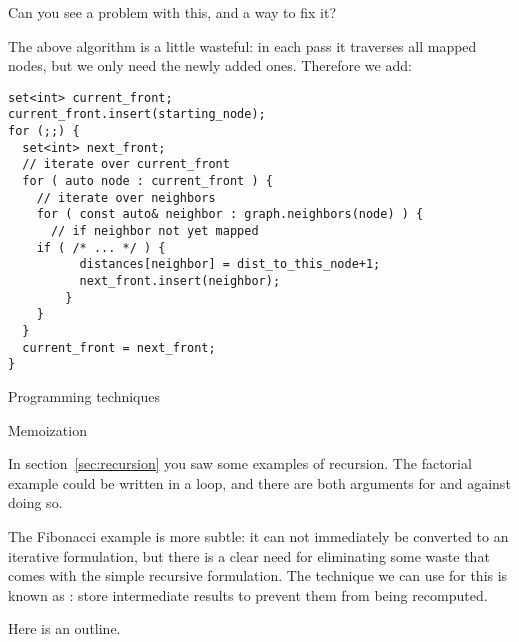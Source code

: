 \begin{exercise}
  Can you see a problem with this, and a way to fix it?
\end{exercise}

The above algorithm is a little wasteful:
in each pass it traverses all mapped nodes,
but we only need the newly added ones.
Therefore we add:
\begin{lstlisting}
set<int> current_front;
current_front.insert(starting_node);
for (;;) {  
  set<int> next_front;
  // iterate over current_front
  for ( auto node : current_front ) {
    // iterate over neighbors
    for ( const auto& neighbor : graph.neighbors(node) ) {
      // if neighbor not yet mapped
	if ( /* ... */ ) {
          distances[neighbor] = dist_to_this_node+1;
          next_front.insert(neighbor);
        }
    }
  }
  current_front = next_front;
}
\end{lstlisting}

 {Programming techniques}

 {Memoization}
\label{sec:memo}

In section~\ref{sec:recursion} you saw some examples of recursion. The
factorial example could be written in a loop, and there are both arguments
for and against doing so. 

The Fibonacci example is more subtle: it can not immediately be
converted to an iterative formulation, but there is a clear need for
eliminating some waste that comes with the simple recursive
formulation. The technique we can use for this is known as
: store intermediate results to prevent them
from being recomputed.

Here is an outline.
